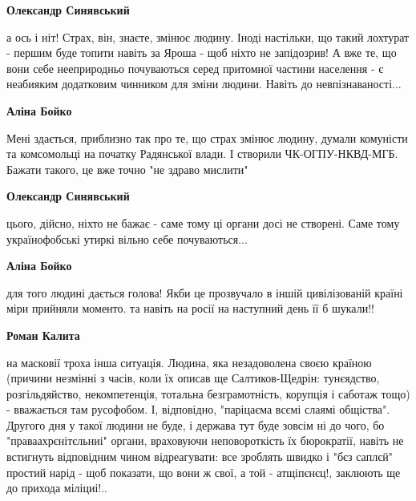 \begin{itemize}
\begin{itemize}
\begin{itemize}
\textbf{Олександр Синявський} 

а ось і ніт! Страх, він, знаєте, змінює людину. Іноді настільки, що такий
лохтурат - першим буде топити навіть за Яроша - щоб ніхто не запідозрив! А вже
те, що вони себе нееприродньо почуваються серед притомної частини населення - є
неабияким додатковим чинником для зміни людини. Навіть до невпізнаваності...

 
\textbf{Аліна Бойко} 

Мені здається, приблизно так про те, що страх змінює людину, думали комуністи
та комсомольці на початку Радянської влади. І створили ЧК-ОГПУ-НКВД-МГБ. Бажати
такого, це вже точно "не здраво мислити"


 
\textbf{Олександр Синявський} 

цього, дійсно, ніхто не бажає - саме тому ці органи досі не створені. Саме тому
українофобські утиркі вільно себе почуваються...

 
\textbf{Аліна Бойко} 

для того людині дається голова! Якби це прозвучало в іншій цивілізованій країні
міри прийняли моменто. та навіть на росії на наступний день її б шукали!!


 
\textbf{Роман Калита} 

на масковії троха інша ситуація. Людина, яка незадоволена своєю країною
(причини незмінні з часів, коли їх описав ще Салтиков-Щедрін: тунєядство,
розгільдяйство, некомпетенція, тотальна безграмотність, корупція і саботаж
тощо) - вважається там русофобом. І, відповідно, "паріцаєма всємі слаямі
общіства". Другого дня у такої людини не буде, і держава тут буде зовсім ні до
чого, бо "праваахрєнітєльниі" органи, враховуючи неповороткість їх бюрократії,
навіть не встигнуть відповідним чином відреагувати: все зроблять швидко і "бєз
саплєй" простий нарід - щоб показати, що вони ж свої, а той - атщіпєнєц!,
заклюють ще до прихода міліциі!..


\end{itemize}
\end{itemize}
\end{itemize}
